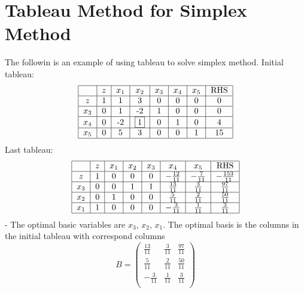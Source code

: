 		\section{Tableau Method for Simplex Method}
			The followin is an example of using tableau to solve simplex method.
				Initial tableau:\\
				\begin{align}
					\begin{tabular} {|c|c|c|c|c|c|c|c|}
						\hline
						& $z$ & $x_1$ & $x_2$ & $x_3$ & $x_4$ & $x_5$ & RHS \\
						\hline
						$z$ & 1 & 1 & 3 & 0 & 0 & 0 & 0 \\
						\hline
						$x_3$ & 0 & 1 & -2 & 1 & 0 & 0 & 0 \\
						\hline
						$x_4$ & 0 & -2 & \framebox{1} & 0 & 1 & 0 & 4\\
						\hline
						$x_5$ & 0 & 5 & 3 & 0 & 0 & 1 & 15 \\
						\hline
					\end{tabular}
				\end{align}
				Last tableau:\\
				\begin{align}
					\begin{tabular} {|c|c|c|c|c|c|c|c|}
						\hline
						& $z$ & $x_1$ & $x_2$ & $x_3$ & $x_4$ & $x_5$ & RHS \\
						\hline
						$z$ & 1 & 0 & 0 & 0 & $-\frac{12}{11}$ & $-\frac{7}{11}$ & $-\frac{153}{11}$ \\
						\hline
						$x_3$ & 0 & 0 & 1 & 1 & $\frac{13}{11}$ & $\frac{3}{11}$ & $\frac{97}{11}$ \\
						\hline
						$x_2$ & 0 & 1 & 0 & 0 & $\frac{5}{11}$ & $\frac{2}{11}$ & $\frac{50}{11}$ \\
						\hline
						$x_1$ & 1 & 0 & 0 & 0 & $-\frac{3}{11}$ & $\frac{1}{11}$ & $\frac{3}{11}$ \\
						\hline
					\end{tabular}
				\end{align}
				- The optimal basic variables are $x_3$, $x_2$, $x_1$. The optimal basis is the columns in the initial tableau with correspond columns
				\begin{equation}
					B = \left(\begin{matrix}
						\frac{13}{11} & \frac{3}{11} & \frac{97}{11}\\
						\frac{5}{11} & \frac{2}{11} & \frac{50}{11}\\
						-\frac{3}{11} & \frac{1}{11} & \frac{3}{11}\\
					\end{matrix}\right)
				\end{equation}
